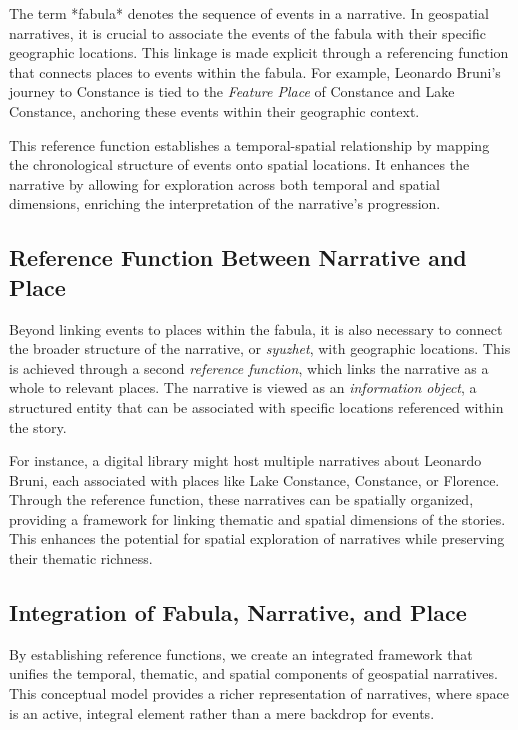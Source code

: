 The term *fabula* denotes the sequence of events in a narrative. In geospatial narratives, it is crucial to associate the events of the fabula with their specific geographic locations. This linkage is made explicit through a referencing function that connects places to events within the fabula. For example, Leonardo Bruni’s journey to Constance is tied to the \textit{Feature Place} of Constance and Lake Constance, anchoring these events within their geographic context.

This reference function establishes a temporal-spatial relationship by mapping the chronological structure of events onto spatial locations. It enhances the narrative by allowing for exploration across both temporal and spatial dimensions, enriching the interpretation of the narrative’s progression.

\subsection{Reference Function Between Narrative and Place}\label{V-subsec:referenceFunctionNarrativePlace}

Beyond linking events to places within the fabula, it is also necessary to connect the broader structure of the narrative, or \textit{syuzhet}, with geographic locations. This is achieved through a second \textit{reference function}, which links the narrative as a whole to relevant places. The narrative is viewed as an \textit{information object}, a structured entity that can be associated with specific locations referenced within the story.

For instance, a digital library might host multiple narratives about Leonardo Bruni, each associated with places like Lake Constance, Constance, or Florence. Through the reference function, these narratives can be spatially organized, providing a framework for linking thematic and spatial dimensions of the stories. This enhances the potential for spatial exploration of narratives while preserving their thematic richness.

\subsection{Integration of Fabula, Narrative, and Place}\label{V-subsec:integrationFabulaNarrativePlace}

By establishing reference functions, we create an integrated framework that unifies the temporal, thematic, and spatial components of geospatial narratives. This conceptual model provides a richer representation of narratives, where space is an active, integral element rather than a mere backdrop for events.

